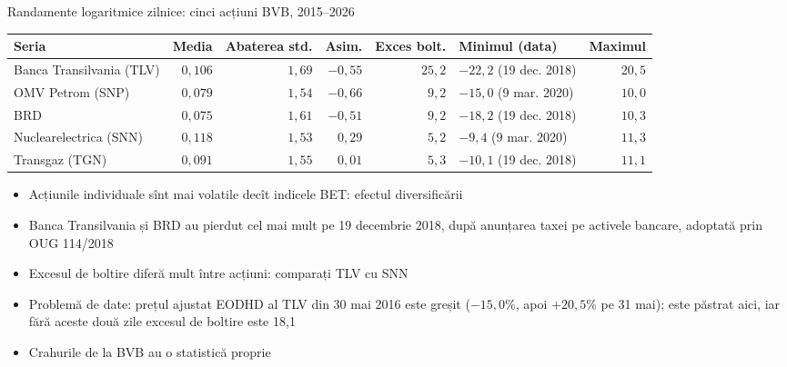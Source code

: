 \begin{frame}{Randamente logaritmice zilnice: cinci acțiuni BVB, 2015--2026}
\itemsize{\small}
\begin{center}
\footnotesize
\begin{tabular}{lrrrrlr}
\toprule
Seria & Media & Abaterea std. & Asim. & Exces bolt. & Minimul (data) & Maximul \\
\midrule
Banca Transilvania (TLV) & $0{,}106$ & $1{,}69$ & $-0{,}55$ & $25{,}2$ & $-22{,}2$ (19 dec. 2018) & $20{,}5$ \\
OMV Petrom (SNP) & $0{,}079$ & $1{,}54$ & $-0{,}66$ & $9{,}2$ & $-15{,}0$ (9 mar. 2020) & $10{,}0$ \\
BRD & $0{,}075$ & $1{,}61$ & $-0{,}51$ & $9{,}2$ & $-18{,}2$ (19 dec. 2018) & $10{,}3$ \\
Nuclearelectrica (SNN) & $0{,}118$ & $1{,}53$ & $0{,}29$ & $5{,}2$ & $-9{,}4$ (9 mar. 2020) & $11{,}3$ \\
Transgaz (TGN) & $0{,}091$ & $1{,}55$ & $0{,}01$ & $5{,}3$ & $-10{,}1$ (19 dec. 2018) & $11{,}1$ \\
\bottomrule
\end{tabular}
\end{center}
\begin{itemize}
    \item Acțiunile individuale sînt mai volatile decît indicele BET: efectul diversificării
    \item Banca Transilvania și BRD au pierdut cel mai mult pe 19 decembrie 2018, după anunțarea taxei pe activele bancare, adoptată prin OUG 114/2018
    \item Excesul de boltire diferă mult între acțiuni: comparați TLV cu SNN
    \item Problemă de date: prețul ajustat EODHD al TLV din 30 mai 2016 este greșit ($-15{,}0\%$, apoi $+20{,}5\%$ pe 31 mai); este păstrat aici, iar fără aceste două zile excesul de boltire este 18{,}1
    \item Crahurile de la BVB au o statistică proprie 
\end{itemize}
\end{frame}

